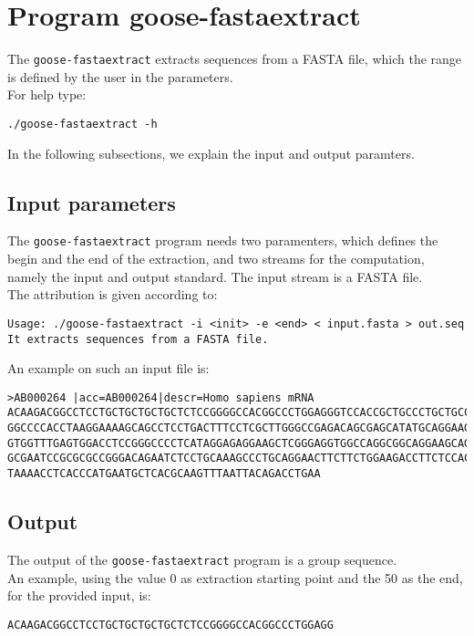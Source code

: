 \section{Program goose-fastaextract}
The \texttt{goose-fastaextract} extracts sequences from a FASTA file, which the range is defined by the user in the parameters.\\
For help type:
\begin{lstlisting}
./goose-fastaextract -h
\end{lstlisting}
In the following subsections, we explain the input and output paramters.

\subsection{Input parameters}

The \texttt{goose-fastaextract} program needs two paramenters, which defines the begin and the end of the extraction, and two streams for the computation, namely the input and output standard. The input stream is a FASTA file.\\
The attribution is given according to:
\begin{lstlisting}
Usage: ./goose-fastaextract -i <init> -e <end> < input.fasta > out.seq
It extracts sequences from a FASTA file.
\end{lstlisting}
An example on such an input file is:
\begin{lstlisting}
>AB000264 |acc=AB000264|descr=Homo sapiens mRNA 
ACAAGACGGCCTCCTGCTGCTGCTGCTCTCCGGGGCCACGGCCCTGGAGGGTCCACCGCTGCCCTGCTGCCATTGTCCCC
GGCCCCACCTAAGGAAAAGCAGCCTCCTGACTTTCCTCGCTTGGGCCGAGACAGCGAGCATATGCAGGAAGCGGCAGGAA
GTGGTTTGAGTGGACCTCCGGGCCCCTCATAGGAGAGGAAGCTCGGGAGGTGGCCAGGCGGCAGGAAGCAGGCCAGTGCC
GCGAATCCGCGCGCCGGGACAGAATCTCCTGCAAAGCCCTGCAGGAACTTCTTCTGGAAGACCTTCTCCACCCCCCCAGC
TAAAACCTCACCCATGAATGCTCACGCAAGTTTAATTACAGACCTGAA
\end{lstlisting}

\subsection{Output}
The output of the \texttt{goose-fastaextract} program is a group sequence.\\
An example, using the value 0 as extraction starting point and the 50 as the end, for the provided input, is:
\begin{lstlisting}
ACAAGACGGCCTCCTGCTGCTGCTGCTCTCCGGGGCCACGGCCCTGGAGG
\end{lstlisting}